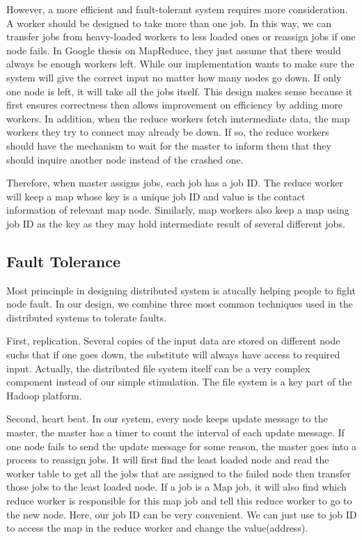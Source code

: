 \documentclass[12pt]{article}
\begin{document}
However, a more efficient and fault-tolerant system requires more consideration. A worker should be designed to take more than one job. In this
way, we can transfer jobs from heavy-loaded workers to less loaded ones or reassign jobs if one node fails. In Google thesis on MapReduce, they just assume that there would always be enough workers left. While our implementation wants to make sure the system will give the correct input no matter how many nodes go down. If only one node is left, it will take all the jobs itself. This design makes sense because it first ensures correctness then allows improvement on efficiency by adding more workers.
In addition, when the reduce workers fetch imtermediate data, the map workers they try to connect may already be down. If so, the reduce workers
should have the mechanism to wait for the master to inform them that they should inquire another node instead of the crashed one.

Therefore, when master assigns jobs, each job has a job ID. The reduce worker will keep a map whose key is a unique job ID and value is the contact information of relevant map node. Similarly, map workers also keep a map using job ID as the key as they may hold intermediate result of several different jobs.
    
\subsection{Fault Tolerance}

Most princinple in designing distributed system is atucally helping people to fight node fault. In our design, we combine three most common techniques used in the distributed systems to tolerate faults.

First, replication. Several copies of the input data are stored on different node suchs that if one goes down, the substitute will always have access to required input. Actually, the distributed file system itself can be a very complex component instead of our simple stimulation. The file system is a key part of the Hadoop platform.   

Second, heart beat. In our system, every node keeps update message to the master, the master has a timer to count the interval of each update message. If one node fails to send the update message for some reason, the master goes into a process to reassign jobs. It will first find the least loaded node and read the worker table to get all the jobs that are assigned to the failed node then transfer those jobs to the least loaded node. If a job is a Map job, it will also find which reduce worker is responsible for this map job and tell this reduce worker to go to the new node. Here, our job ID can be very convenient. We can just use to job ID to access the map in the reduce worker and change the value(address).
 
\end{document}
